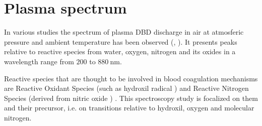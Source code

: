 \chapter{Plasma spectrum}
\label{ch:spectrometry}
In various studies the spectrum of plasma DBD discharge in air at atmosferic pressure and ambient temperature has been observed (\cite{DBDair_Trot}, \cite{DBDAirTypicalSpec}). It presents peaks relative to reactive species from water, oxygen, nitrogen and its oxides in a wavelength range from $\num{200}$ to $\SI{880}{\nano\meter}$.

Reactive species that are thought to be involved in blood coagulation mechanisms are Reactive Oxidant Species (such as hydroxil radical ) and Reactive Nitrogen Species (derived from nitric oxide ) \cite{6153386}. This spectroscopy study is focalized on them and their precursor, i.e. on transitions relative to hydroxil, oxygen and molecular nitrogen.


